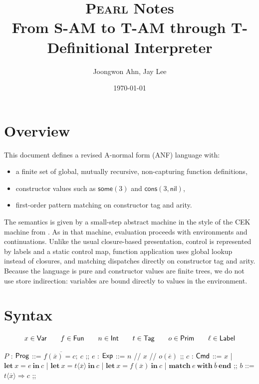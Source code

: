 \documentclass[11pt]{article}
\title{\textsc{Pearl} Notes\\From S-AM to T-AM through T-Definitional Interpreter}
\author{Joongwon Ahn, Jay Lee}
\date{\today}
\begin{document}
\maketitle

\section{Overview}
This document defines a revised A-normal form (ANF) language with:
\begin{itemize}
\item a finite set of global, mutually recursive, non-capturing function definitions,
\item constructor values such as $\mathsf{some}(3)$ and $\mathsf{cons}(3,\mathsf{nil})$,
\item first-order pattern matching on constructor tag and arity.
\end{itemize}

The semantics is given by a small-step abstract machine in the style of the CEK machine from \citet{FlaSabDubFel93Essence}.
As in that machine, evaluation proceeds with environments and continuations.
Unlike the usual closure-based presentation, control is represented by labels and a static control map, function application uses global lookup instead of closures, and matching dispatches directly on constructor tag and arity.
Because the language is pure and constructor values are finite trees, we do not use store indirection: variables are bound directly to values in the environment.

\section{Syntax}
\[
x \in \textsf{Var}
\qquad
f \in \textsf{Fun}
\qquad
n \in \textsf{Int}
\qquad
t \in \textsf{Tag}
\qquad
o \in \textsf{Prim}
\qquad
\ell \in \textsf{Label}
\]
\begin{center}
\begin{bnf}
  $P$ : $\textsf{Prog}$ ::= $\overline{f(\overline{x}) = c;}\ c$
  ;;
  $e$ : $\textsf{Exp}$ ::= $n$ // $x$ // $o(\overline{e})$
  ;;
  $c$ : $\textsf{Cmd}$ ::= $x$
               | $\textbf{let}\ x = e\ \textbf{in}\ c$
               | $\textbf{let}\ x = t\langle\overline{x}\rangle\ \textbf{in}\ c$
               | $\textbf{let}\ x = f(\overline{x})\ \textbf{in}\ c$
               | $\textbf{match}\ e\ \textbf{with}\ \overline{b}\ \textbf{end}$
  ;;
  $b$ ::= $t\langle\overline{x}\rangle \Rightarrow c$
  ;;
\end{bnf}
\end{center}
\end{document}
